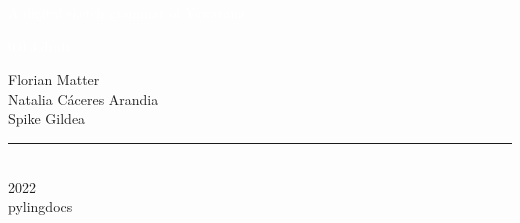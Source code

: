 \begin{titlingpage}
\BgThispage
{}
\vspace*{2cm}
\centering
\textcolor{white}{ \hugefont A digital sketch grammar of Yawarana }
\raggedleft
\vspace*{1cm}\par

\textcolor{white}{ \large 0.0.3.draft }

\vspace*{2cm}\par
\noindent
{
\begin{minipage}{0.90\linewidth}
    \begin{flushright}
        
{\Huge Florian Matter }\\[\baselineskip]

{\Huge Natalia Cáceres Arandia }\\[\baselineskip]

{\Huge Spike Gildea }\\[\baselineskip]

    \end{flushright}
\end{minipage} \hspace{15pt}
}
\centering
\vfill
\rule{0.4\textwidth}{0.4pt}\\
{\Huge 2022 \\ \large pylingdocs }
\end{titlingpage}
